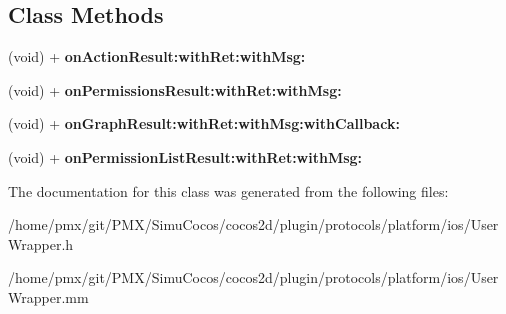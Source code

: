 \subsection*{Class Methods}
\begin{DoxyCompactItemize}
\item 
\mbox{\label{interfaceUserWrapper_af4a181db2dd108867a181cdc3e0e33d3}} 
(void) + {\bfseries on\+Action\+Result\+:with\+Ret\+:with\+Msg\+:}
\item 
\mbox{\label{interfaceUserWrapper_a0f14dbc5c6c683e6ad7bb75aed7bb740}} 
(void) + {\bfseries on\+Permissions\+Result\+:with\+Ret\+:with\+Msg\+:}
\item 
\mbox{\label{interfaceUserWrapper_a2cd9b43d38130a848ee0ce0eb142c907}} 
(void) + {\bfseries on\+Graph\+Result\+:with\+Ret\+:with\+Msg\+:with\+Callback\+:}
\item 
\mbox{\label{interfaceUserWrapper_a1cf50df2f0f46df4bbfefdd251847575}} 
(void) + {\bfseries on\+Permission\+List\+Result\+:with\+Ret\+:with\+Msg\+:}
\end{DoxyCompactItemize}


The documentation for this class was generated from the following files\+:\begin{DoxyCompactItemize}
\item 
/home/pmx/git/\+P\+M\+X/\+Simu\+Cocos/cocos2d/plugin/protocols/platform/ios/User\+Wrapper.\+h\item 
/home/pmx/git/\+P\+M\+X/\+Simu\+Cocos/cocos2d/plugin/protocols/platform/ios/User\+Wrapper.\+mm\end{DoxyCompactItemize}
